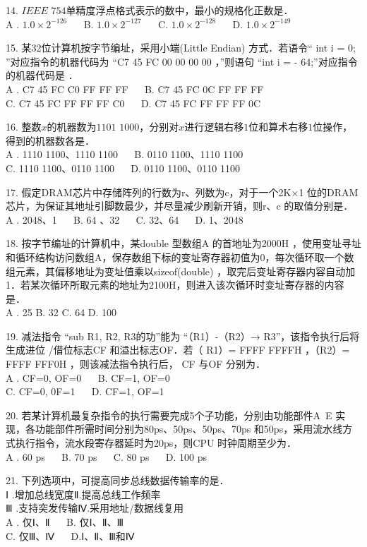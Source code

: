 14. $IEEE$ $754$单精度浮点格式表示的数中，最小的规格化正数是． \\
A . $1.0\times2^{-126}$ $\quad$ B. $1.0\times2^{-127}$ $\quad$ C. $1.0\times2^{-128}$ $\quad$ D. $1.0\times2^{-149}$

15. 某32位计算机按字节编址，采用小端(Little Endian) 方式．若语令“ int i = 0; ”对应指令的机器代码为 “C7 45 FC 00 00 00 00 ，”则语句 “int i = - 64;”对应指令的机器代码是 ． \\
A . C7 45 FC C0 FF FF FF $\quad$ B. C7 45 FC 0C FF FF FF \\
C. C7 45 FC FF FF FF C0 $\quad$ D. C7 45 FC FF FF FF 0C

16. 整数$x$的机器数为$1101$ $1000$，分别对$x$进行逻辑右移$1$位和算术右移$1$位操作， 得到的机器数各是． \\
A . 1110 1100、1110 1100 $\quad$ B. 0110 1100、1110 1100 \\
C. 1110 1100、0110 1100 $\quad$ D. 0110 1100、0110 1100

17. 假定DRAM芯片中存储阵列的行数为r、列数为c，对于一个2K×1 位的DRAM 芯片，为保证其地址引脚数最少，并尽量减少刷新开销，则r、c 的取值分别是． \\
A . 2048、1 $\quad$ B. 64 、32 $\quad$ C. 32、64 $\quad$ D. 1、2048

18. 按字节编址的计算机中，某double 型数组A 的首地址为2000H ，使用变址寻址和循环结构访问数组A，保存数组下标的变址寄存器初值为0，每次循环取一个数组元素，其偏移地址为变址值乘以sizeof(double) ，取完后变址寄存器内容自动加1．若某次循环所取元素的地址为2100H，则进入该次循环时变址寄存器的内容是． \\
A . 25 B. 32 C. 64 D. 100

19. 减法指令 “sub R1, R2, R3的功”能为 “（R1）-（R2）→ R3”，该指令执行后将生成进位 /借位标志CF 和溢出标志OF．若（ R1）= FFFF FFFFH ，（R2）= FFFF FFF0H ，则该减法指令执行后， CF 与OF 分别为． \\
A . CF=0, OF=0 $\quad$ B. CF=1, OF=0 \\
C. CF=0, 0F=1 $\quad$ D. CF=1, OF=1

20. 若某计算机最复杂指令的执行需要完成5个子功能，分别由功能部件A~E 实现，各功能部件所需时间分别为80ps、50ps、50ps、70ps 和50ps，采用流水线方式执行指令，流水段寄存器延时为20ps，则CPU 时钟周期至少为． \\
A . 60 ps $\quad$ B. 70 ps $\quad$ C. 80 ps $\quad$ D. 100 ps

21. 下列选项中，可提高同步总线数据传输率的是． \\
Ⅰ .增加总线宽度Ⅱ.提高总线工作频率 \\
Ⅲ .支持突发传输Ⅳ.采用地址/数据线复用 \\
A . 仅Ⅰ、Ⅱ $\quad$ B. 仅Ⅰ、Ⅱ、Ⅲ \\
C. 仅Ⅲ、Ⅳ $\quad$ D.Ⅰ、Ⅱ、Ⅲ和Ⅳ

